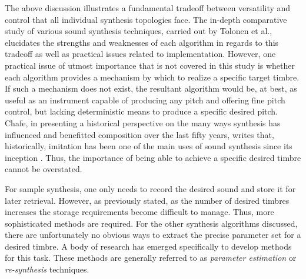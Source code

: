 \documentclass[12pt]{report} 	%
\numberwithin{figure}{chapter}
\numberwithin{table}{chapter}
\numberwithin{equation}{chapter}
\begin{document}
\begin{flushleft}
The above discussion illustrates a fundamental tradeoff between versatility and control that all individual synthesis topologies face. The in-depth comparative study of various sound synthesis techniques, carried out by Tolonen et al., elucidates the strengths and weaknesses of each algorithm in regards to this tradeoff as well as practical issues related to implementation. However, one practical issue of utmost importance that is not covered in this study is whether each algorithm provides a mechanism by which to realize a specific target timbre. If such a mechanism does not exist, the resultant algorithm would be, at best, as useful as an instrument capable of producing any pitch and offering fine pitch control, but lacking deterministic means to produce a specific desired pitch. Chafe, in presenting a historical perspective on the many ways synthesis has influenced and benefitted composition over the last fifty years, writes that, historically, imitation has been one of the main uses of sound synthesis since its inception \cite[p. 2]{Chafe:1999bx}. Thus, the importance of being able to achieve a specific desired timbre cannot be overstated.

For sample synthesis, one only needs to record the desired sound and store it for later retrieval. However, as previously stated, as the number of desired timbres increases the storage requirements become difficult to manage. Thus, more sophisticated methods are required. For the other synthesis algorithms discussed, there are unfortunately no obvious ways to extract the precise parameter set for a desired timbre. A body of research has emerged specifically to develop methods for this task. These methods are generally referred to as \textit{parameter estimation} or \textit{re-synthesis} techniques.
\vspace{12pt}

\end{flushleft}
\end{document}
